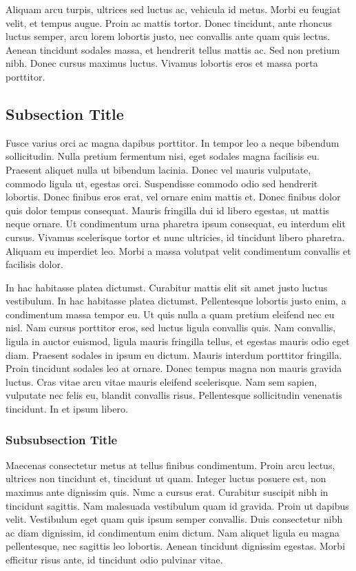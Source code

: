 \documentclass[
	11pt,
	fleqn,
	a4paper,
]{LegrandOrangeBook}
\begin{document}
Aliquam arcu turpis, ultrices sed luctus ac, vehicula id metus. Morbi eu feugiat velit, et tempus augue. Proin ac mattis tortor. Donec tincidunt, ante rhoncus luctus semper, arcu lorem lobortis justo, nec convallis ante quam quis lectus. Aenean tincidunt sodales massa, et hendrerit tellus mattis ac. Sed non pretium nibh. Donec cursus maximus luctus. Vivamus lobortis eros et massa porta porttitor.

\subsection{Subsection Title}

Fusce varius orci ac magna dapibus porttitor. In tempor leo a neque bibendum sollicitudin. Nulla pretium fermentum nisi, eget sodales magna facilisis eu. Praesent aliquet nulla ut bibendum lacinia. Donec vel mauris vulputate, commodo ligula ut, egestas orci. Suspendisse commodo odio sed hendrerit lobortis. Donec finibus eros erat, vel ornare enim mattis et. Donec finibus dolor quis dolor tempus consequat. Mauris fringilla dui id libero egestas, ut mattis neque ornare. Ut condimentum urna pharetra ipsum consequat, eu interdum elit cursus. Vivamus scelerisque tortor et nunc ultricies, id tincidunt libero pharetra. Aliquam eu imperdiet leo. Morbi a massa volutpat velit condimentum convallis et facilisis dolor.

In hac habitasse platea dictumst. Curabitur mattis elit sit amet justo luctus vestibulum. In hac habitasse platea dictumst. Pellentesque lobortis justo enim, a condimentum massa tempor eu. Ut quis nulla a quam pretium eleifend nec eu nisl. Nam cursus porttitor eros, sed luctus ligula convallis quis. Nam convallis, ligula in auctor euismod, ligula mauris fringilla tellus, et egestas mauris odio eget diam. Praesent sodales in ipsum eu dictum. Mauris interdum porttitor fringilla. Proin tincidunt sodales leo at ornare. Donec tempus magna non mauris gravida luctus. Cras vitae arcu vitae mauris eleifend scelerisque. Nam sem sapien, vulputate nec felis eu, blandit convallis risus. Pellentesque sollicitudin venenatis tincidunt. In et ipsum libero.

\subsubsection{Subsubsection Title} 

Maecenas consectetur metus at tellus finibus condimentum. Proin arcu lectus, ultrices non tincidunt et, tincidunt ut quam. Integer luctus posuere est, non maximus ante dignissim quis. Nunc a cursus erat. Curabitur suscipit nibh in tincidunt sagittis. Nam malesuada vestibulum quam id gravida. Proin ut dapibus velit. Vestibulum eget quam quis ipsum semper convallis. Duis consectetur nibh ac diam dignissim, id condimentum enim dictum. Nam aliquet ligula eu magna pellentesque, nec sagittis leo lobortis. Aenean tincidunt dignissim egestas. Morbi efficitur risus ante, id tincidunt odio pulvinar vitae.
\end{document}
